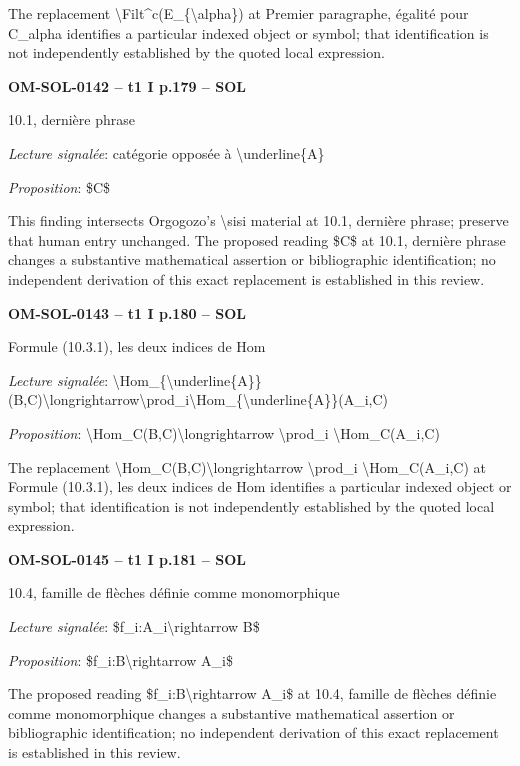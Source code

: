 The replacement \textbackslash{}Filt\textasciicircum{}c(E\_\{\textbackslash{}alpha\}) at Premier paragraphe, égalité pour C\_alpha identifies a particular indexed object or symbol; that identification is not independently established by the quoted local expression.\par
\par\noindent\textbf{OM-SOL-0142 -- t1 I p.179 -- SOL}\par
10.1, dernière phrase\par
\emph{Lecture signalée}: catégorie opposée à \textbackslash{}underline\{A\}\par
\emph{Proposition}: \$C\$\par
This finding intersects Orgogozo's \textbackslash{}sisi material at 10.1, dernière phrase; preserve that human entry unchanged. The proposed reading \$C\$ at 10.1, dernière phrase changes a substantive mathematical assertion or bibliographic identification; no independent derivation of this exact replacement is established in this review.\par
\par\noindent\textbf{OM-SOL-0143 -- t1 I p.180 -- SOL}\par
Formule (10.3.1), les deux indices de Hom\par
\emph{Lecture signalée}: \textbackslash{}Hom\_\{\textbackslash{}underline\{A\}\}(B,C)\textbackslash{}longrightarrow\textbackslash{}prod\_i\textbackslash{}Hom\_\{\textbackslash{}underline\{A\}\}(A\_i,C)\par
\emph{Proposition}: \textbackslash{}Hom\_C(B,C)\textbackslash{}longrightarrow \textbackslash{}prod\_i \textbackslash{}Hom\_C(A\_i,C)\par
The replacement \textbackslash{}Hom\_C(B,C)\textbackslash{}longrightarrow \textbackslash{}prod\_i \textbackslash{}Hom\_C(A\_i,C) at Formule (10.3.1), les deux indices de Hom identifies a particular indexed object or symbol; that identification is not independently established by the quoted local expression.\par
\par\noindent\textbf{OM-SOL-0145 -- t1 I p.181 -- SOL}\par
10.4, famille de flèches définie comme monomorphique\par
\emph{Lecture signalée}: \$f\_i:A\_i\textbackslash{}rightarrow B\$\par
\emph{Proposition}: \$f\_i:B\textbackslash{}rightarrow A\_i\$\par
The proposed reading \$f\_i:B\textbackslash{}rightarrow A\_i\$ at 10.4, famille de flèches définie comme monomorphique changes a substantive mathematical assertion or bibliographic identification; no independent derivation of this exact replacement is established in this review.\par
